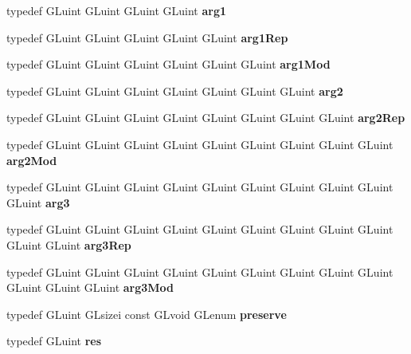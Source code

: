 \begin{DoxyCompactItemize}
\item 
typedef G\+Luint G\+Luint G\+Luint G\+Luint {\bfseries arg1}\label{_s_d_l__opengl_8h_a4b247ab422408c1761a36f9034c2585b}

\item 
typedef G\+Luint G\+Luint G\+Luint G\+Luint G\+Luint {\bfseries arg1\+Rep}\label{_s_d_l__opengl_8h_a23955e5e637582f309872077096f1be2}

\item 
typedef G\+Luint G\+Luint G\+Luint G\+Luint G\+Luint G\+Luint {\bfseries arg1\+Mod}\label{_s_d_l__opengl_8h_a101460b65b01480715a6d7cacfb50015}

\item 
typedef G\+Luint G\+Luint G\+Luint G\+Luint G\+Luint G\+Luint G\+Luint {\bfseries arg2}\label{_s_d_l__opengl_8h_a5aee5a44bf92a9837fea48e41ef0df57}

\item 
typedef G\+Luint G\+Luint G\+Luint G\+Luint G\+Luint G\+Luint G\+Luint G\+Luint {\bfseries arg2\+Rep}\label{_s_d_l__opengl_8h_ae086eac70e0d701967af9657b36d7efd}

\item 
typedef G\+Luint G\+Luint G\+Luint G\+Luint G\+Luint G\+Luint G\+Luint G\+Luint G\+Luint {\bfseries arg2\+Mod}\label{_s_d_l__opengl_8h_ab1de83cb06a6a9589e484779c84bb994}

\item 
typedef G\+Luint G\+Luint G\+Luint G\+Luint G\+Luint G\+Luint G\+Luint G\+Luint G\+Luint G\+Luint {\bfseries arg3}\label{_s_d_l__opengl_8h_a525a52cc20e1aa70741e5c7dae172f25}

\item 
typedef G\+Luint G\+Luint G\+Luint G\+Luint G\+Luint G\+Luint G\+Luint G\+Luint G\+Luint G\+Luint G\+Luint {\bfseries arg3\+Rep}\label{_s_d_l__opengl_8h_afeeeff457271a76f6929b9bab61cee0e}

\item 
typedef G\+Luint G\+Luint G\+Luint G\+Luint G\+Luint G\+Luint G\+Luint G\+Luint G\+Luint G\+Luint G\+Luint G\+Luint {\bfseries arg3\+Mod}\label{_s_d_l__opengl_8h_a9c4bab1420a0f312fb144c1ffab9739b}

\item 
typedef G\+Luint G\+Lsizei const G\+Lvoid G\+Lenum {\bfseries preserve}\label{_s_d_l__opengl_8h_aab18b6b796a98c5d960c84f7d59049df}

\item 
typedef G\+Luint {\bfseries res}\label{_s_d_l__opengl_8h_a1dbb21208b9047cc8031ca9c840d3c2f}


\end{DoxyCompactItemize}
